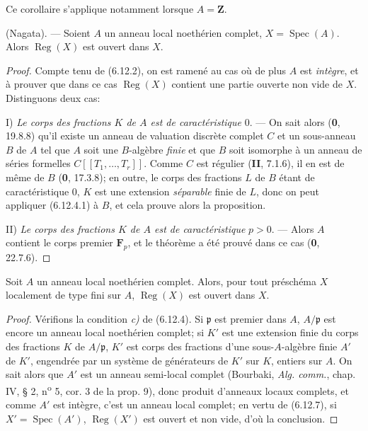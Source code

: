 Ce corollaire s'applique notamment lorsque $A=\mathbf Z$.

\begin{theorem}[6.12.7]
\label{IV.2.s6.12.7-fr}
\textnormal{(Nagata).} --- Soient $A$ un anneau local noethérien complet,
$X=\operatorname{Spec}(A)$. Alors $\operatorname{Reg}(X)$ est ouvert dans
$X$.
\end{theorem}

\begin{proof}
Compte tenu de (6.12.2), on est ramené au cas où de plus $A$ est \emph{intègre}, et
à prouver que dans ce cas $\operatorname{Reg}(X)$ contient une partie
ouverte non vide de $X$. Distinguons deux cas:

I) \emph{Le corps des fractions $K$ de $A$ est de caractéristique} 0. --- On sait
alors (\textbf{0}, 19.8.8) qu'il existe un anneau de valuation discrète complet $C$
et un sous-anneau $B$ de $A$ tel que $A$ soit une $B$-algèbre \emph{finie} et que
$B$ soit isomorphe à un anneau de séries formelles
$C[[T_1,\ldots,T_r]]$. Comme $C$ est régulier (\textbf{II}, 7.1.6), il en est de
même de $B$ (\textbf{0}, 17.3.8); en outre, le corps des fractions $L$ de $B$ étant
de caractéristique 0, $K$ est une extension \emph{séparable} finie de $L$, donc on
peut appliquer (6.12.4.1) à $B$, et cela prouve alors la proposition.

II) \emph{Le corps des fractions $K$ de $A$ est de caractéristique} $p>0$. ---
Alors $A$ contient le corps premier $\mathbf F_p$, et le théorème a été
prouvé dans ce cas (\textbf{0}, 22.7.6).
\end{proof}

\begin{corollary}[6.12.8]
\label{IV.2.s6.12.8-fr}
Soit $A$ un anneau local noethérien complet. Alors, pour tout préschéma $X$
localement de type fini sur $A$, $\operatorname{Reg}(X)$ est ouvert dans
$X$.
\end{corollary}

\begin{proof}
Vérifions la condition \emph{c)} de (6.12.4). Si $\mathfrak p$ est premier dans
$A$, $A/\mathfrak p$ est encore un anneau local noethérien complet; si $K'$
est une extension finie du corps des fractions $K$ de $A/\mathfrak p$, $K'$
est corps des fractions d'une sous-$A$-algèbre finie $A'$ de $K'$, engendrée
par un système de générateurs de $K'$ sur $K$, entiers sur $A$. On sait
alors que $A'$ est un anneau semi-local complet (Bourbaki, \emph{Alg. comm.},
chap. IV, § 2, n\textsuperscript{o} 5, cor. 3 de la prop. 9), donc produit d'anneaux locaux
complets, et comme $A'$ est intègre, c'est un anneau local complet; en vertu
de (6.12.7), si $X'=\operatorname{Spec}(A')$,
$\operatorname{Reg}(X')$ est ouvert et non vide, d'où la conclusion.
\end{proof}

